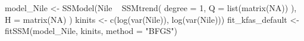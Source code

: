 \begin{Schunk}
\begin{Sinput}
 model_Nile <- SSModel(Nile ~ SSMtrend(
   degree = 1,
   Q = list(matrix(NA))
 ),
 H = matrix(NA)
 )
 kinits <- c(log(var(Nile)), log(var(Nile)))
 fit_kfas_default <- fitSSM(model_Nile, kinits, method = "BFGS")
\end{Sinput}
\end{Schunk}

